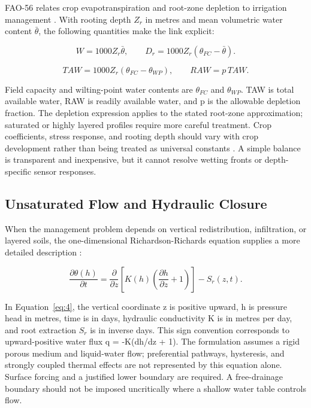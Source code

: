 \documentclass[acmsmall,screen,nonacm]{acmart}
\begin{document}
FAO-56 relates crop evapotranspiration and root-zone depletion to irrigation management \cite{R06}. With rooting depth $Z_{r}$ in metres and mean volumetric water content $\bar\theta$, the following quantities make the link explicit:

\begin{equation}
W=1000Z_r\bar\theta,\qquad D_r=1000Z_r(\theta_{FC}-\bar\theta).
\label{eq:2}
\end{equation}

\begin{equation}
TAW=1000Z_r(\theta_{FC}-\theta_{WP}),\qquad RAW=p\,TAW.
\label{eq:3}
\end{equation}

Field capacity and wilting-point water contents are $\theta_{FC}$ and $\theta_{WP}$. TAW is total available water, RAW is readily available water, and p is the allowable depletion fraction. The depletion expression applies to the stated root-zone approximation; saturated or highly layered profiles require more careful treatment. Crop coefficients, stress response, and rooting depth should vary with crop development rather than being treated as universal constants \cite{R06}. A simple balance is transparent and inexpensive, but it cannot resolve wetting fronts or depth-specific sensor responses.

\subsection{Unsaturated Flow and Hydraulic Closure}

\label{sec:4-2}

When the management problem depends on vertical redistribution, infiltration, or layered soils, the one-dimensional Richardson-Richards equation supplies a more detailed description \cite{R07}:

\begin{equation}
\frac{\partial\theta(h)}{\partial t}=\frac{\partial}{\partial z}\left[K(h)\left(\frac{\partial h}{\partial z}+1\right)\right]-S_r(z,t).
\label{eq:4}
\end{equation}

In Equation~\eqref{eq:4}, the vertical coordinate z is positive upward, h is pressure head in metres, time is in days, hydraulic conductivity K is in metres per day, and root extraction $S_{r}$ is in inverse days. This sign convention corresponds to upward-positive water flux q = -K(dh/dz + 1). The formulation assumes a rigid porous medium and liquid-water flow; preferential pathways, hysteresis, and strongly coupled thermal effects are not represented by this equation alone. Surface forcing and a justified lower boundary are required. A free-drainage boundary should not be imposed uncritically where a shallow water table controls flow.
\end{document}
